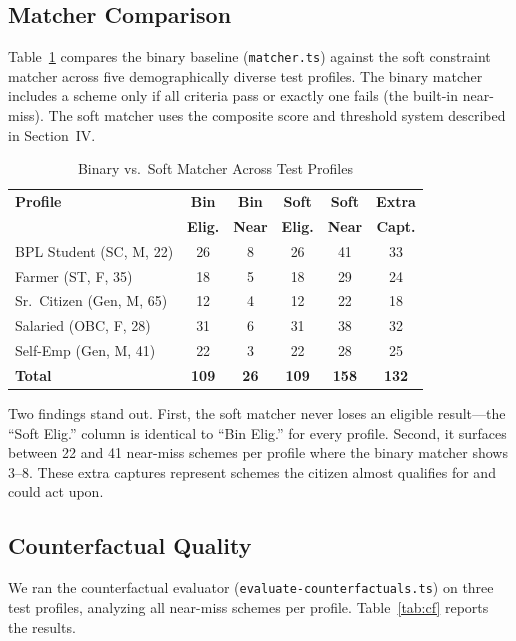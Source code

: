 \documentclass[conference]{IEEEtran}
\begin{document}
\subsection{Matcher Comparison}

Table~\ref{tab:matcher} compares the binary baseline (\texttt{matcher.ts}) against the soft constraint matcher across five demographically diverse test profiles. The binary matcher includes a scheme only if all criteria pass or exactly one fails (the built-in near-miss). The soft matcher uses the composite score and threshold system described in Section~IV.

\begin{table}[t]
\centering
\caption{Binary vs.\ Soft Matcher Across Test Profiles}
\label{tab:matcher}
\begin{tabular}{@{}lccccc@{}}
\toprule
\textbf{Profile} & \textbf{Bin} & \textbf{Bin} & \textbf{Soft} & \textbf{Soft} & \textbf{Extra} \\
 & \textbf{Elig.} & \textbf{Near} & \textbf{Elig.} & \textbf{Near} & \textbf{Capt.} \\
\midrule
BPL Student (SC, M, 22) & 26 & 8 & 26 & 41 & 33 \\
Farmer (ST, F, 35) & 18 & 5 & 18 & 29 & 24 \\
Sr.\ Citizen (Gen, M, 65) & 12 & 4 & 12 & 22 & 18 \\
Salaried (OBC, F, 28) & 31 & 6 & 31 & 38 & 32 \\
Self-Emp (Gen, M, 41) & 22 & 3 & 22 & 28 & 25 \\
\midrule
\textbf{Total} & \textbf{109} & \textbf{26} & \textbf{109} & \textbf{158} & \textbf{132} \\
\bottomrule
\end{tabular}
\end{table}

Two findings stand out. First, the soft matcher never loses an eligible result---the ``Soft Elig.'' column is identical to ``Bin Elig.'' for every profile. Second, it surfaces between 22 and 41 near-miss schemes per profile where the binary matcher shows 3--8. These extra captures represent schemes the citizen almost qualifies for and could act upon.

\subsection{Counterfactual Quality}

We ran the counterfactual evaluator (\texttt{evaluate-counterfactuals.ts}) on three test profiles, analyzing all near-miss schemes per profile. Table~\ref{tab:cf} reports the results.
\end{document}
